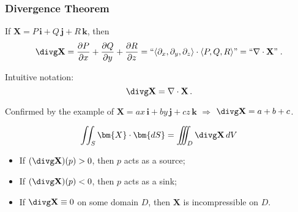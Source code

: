 \begin{frame}
  \frametitle{Divergence Theorem}

%
If $\textbf{X} = P\, \textbf{i} + Q\, \textbf{j} +R\, \textbf{k}$, then
%
$$\divg \textbf{X} = \frac{\partial P}{\partial x}+ \frac{\partial Q}{\partial y} + \frac{\partial R}{\partial z}  = ``\langle \partial_x, \partial_y, \partial_z \rangle \cdot \langle P, Q, R\rangle" =  ``\nabla \cdot \textbf{X}"\; .$$

Intuitive notation:
%
$$\divg \textbf{X} = \nabla \cdot \textbf{X}\, .$$

\pause Confirmed by the example of $\textbf{X} = ax \, \textbf{i} + by\, \textbf{j} + cz\, \textbf{k}$ $\Longrightarrow$ $\divg \textbf{X} = a+b+c$.\pause

\begin{theorem}
$$\iint_S \bm{X} \cdot \bm{dS} = \int\!\!\!\!\!\int\!\!\!\!\!\int_D \divg \textbf{X} \, dV$$
\end{theorem}

\begin{itemize}
  \item \pause If $(\divg \textbf{X})(p)>0$, then \pause $p$ acts as a source;
  \item \pause If $(\divg \textbf{X})(p)<0$, then \pause $p$ acts as a sink;
  \item \pause If $\divg \textbf{X} \equiv 0$ on some domain $D$, then \pause $\textbf{X}$ is incompressible on $D$.
\end{itemize}

\end{frame}
